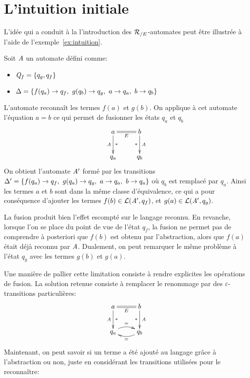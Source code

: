 



\section{L'intuition initiale}
\label{sec:intuition}
L'idée qui a conduit à la l'introduction des ${\mathcal R_{/E}}$-automates peut être illustrée à l'aide de l'exemple~\ref{ex:intuition}.
\begin{example}
  \label{ex:intuition}
  Soit $\mathit A$ un automate défini comme:
  \begin{itemize}
  \item $\mathit Q_f = \{ q_g, q_f\}$
  \item $\Delta = \{ f(q_a) \rightarrow q_f,\ g(q_b) \rightarrow q_g,\ a\rightarrow q_a,\ b\rightarrow q_b\}$
  \end{itemize}
  L'automate reconnaît les termes $f(a)$ et $g(b)$.
  On applique à cet automate l'équation $a = b$ ce qui permet de fusionner les états $q_a$ et $q_b$
  \[\xymatrix{
    a \ar@{=}_{E}[r]\ar[d]_{\A}^{*} & b \ar[d]_{*}^{\A}\\
    q_a & q_b
  }
  \]
  On obtient l'automate $\mathit A'$ formé par les transitions $\Delta' = \{ f(q_a) \rightarrow q_f,\ g(q_a) \rightarrow q_g,\ a\rightarrow q_a,\ b\rightarrow q_a\}$
  où $q_b$ est remplacé par $q_a$. Ainsi les termes $a$ et $b$ sont dans la même classe d'équivalence, ce qui a pour 
  conséquence d'ajouter les termes $f(b) \in \mathcal{L}(\mathit A', q_f)$, et $g(a) \in \mathcal{L}(\mathit A', q_g)$.
\end{example}

  La fusion produit bien l'effet escompté sur le langage reconnu. En revanche, lorsque l'on se place du point de vue
  de l'état $q_f$, la fusion ne permet pas de comprendre à posteriori que  $f(b)$ est obtenu par l'abstraction, 
  alors que $f(a)$ était déjà reconnu par $\mathit A$. Dualement, on peut remarquer le même problème à l'état $q_g$ avec les termes
  $g(b)$ et $g(a)$.

  Une manière de pallier cette limitation consiste à rendre explicites les opérations de fusion.
  La solution retenue consiste à remplacer le renommage par des $\varepsilon$-transitions particulières:
  \[\xymatrix{
    a \ar@{=}_{E}[r]\ar[d]_{\A}^{*} & b \ar[d]_{*}^{\A}\\
    q_a \ar@/^0.6pc/[r]^{=} & q_b \ar@/^0.6pc/[l]^{=}
  }
  \]
  Maintenant, on peut savoir si un terme a été ajouté au langage grâce à l'abstraction ou non, juste en considérant
  les transitions utilisées pour le reconnaître:

